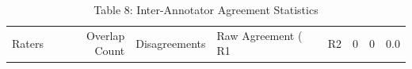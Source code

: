 \begin{table}
\caption{Table 8: Inter-Annotator Agreement Statistics}
\label{tab:table8_inter_annotator_agreement}
\begin{tabular}{lrrlll}
\toprule
Raters & Overlap Count & Disagreements & Raw Agreement (%
\midrule
R1 & R2 & 0 & 0 & 0.0%
\bottomrule
\end{tabular}
\end{table}
